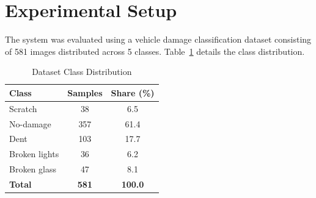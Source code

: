 \documentclass[conference]{IEEEtran}
\begin{document}
\begin{table}[!t]
\centering
\caption{Platform Comparison: Scope, Deployment, and Capabilities}
\label{tab:platform_comparison}
\footnotesize
\setlength{\tabcolsep}{3pt}
\renewcommand{\arraystretch}{1.15}
\end{table}

\section{Experimental Setup}

The system was evaluated using a vehicle damage classification dataset consisting of 581 images distributed across 5 classes. Table~\ref{tab:class_distribution} details the class distribution.

\begin{table}[htbp]
\centering
\caption{Dataset Class Distribution}
\label{tab:class_distribution}
\begin{tabular}{lcc}
\toprule
\textbf{Class} & \textbf{Samples} & \textbf{Share (\%)} \\
\midrule
Scratch & 38 & 6.5 \\
No-damage & 357 & 61.4 \\
Dent & 103 & 17.7 \\
Broken lights & 36 & 6.2 \\
Broken glass & 47 & 8.1 \\
\midrule
\textbf{Total} & \textbf{581} & \textbf{100.0} \\
\bottomrule
\end{tabular}
\end{table}
\end{document}
